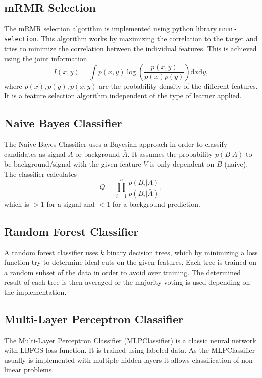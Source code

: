 \subsection{mRMR Selection}
The mRMR selection algorithm is implemented using python library \texttt{mrmr-selection}. This algorithm works by maximizing the correlation to the target and tries to minimize the correlation between the individual features. This is achieved using the joint information 
\begin{equation*}
	I(x,y) = \int p(x,y)\log\left(\frac{p(x,y)}{p(x)p(y)}\right)\mathrm{d}x\mathrm{d}y,
\end{equation*}
where $p(x),p(y),p(x,y)$ are the probability density of the different features. It is a feature selection algorithm independent of the type of learner applied.

\subsection{Naive Bayes Classifier}
The Naive Bayes Classifier uses a Bayesian approach in order to classify candidates as signal $A$ or background $\bar{A}$. It assumes the probability $p(B|A)$ to be background/signal with the given feature $V$ is only dependent on $B$ (naive). The classifier calculates
\begin{equation*}
	Q = \prod_{i=1}^{n} \frac{p(B_i|A)}{p(B_i|\bar{A})},
\end{equation*}
which is $> 1$ for a signal and $< 1$ for a background prediction.

\subsection{Random Forest Classifier}
A random forest classifier uses $k$ binary decision trees, which by minimizing a loss function try to determine ideal cuts on the given features. Each tree is trained on a random subset of the data in order to avoid over training. The determined result of each tree is then averaged or the majority voting is used depending on the implementation. 

\subsection{Multi-Layer Perceptron Classifier}
The Multi-Layer Perceptron Classifier (MLPClassifier) is a classic neural network with LBFGS loss function. It is trained using labeled data. As the MLPClassifier usually is implemented with multiple hidden layers it allows classification of non linear problems.


